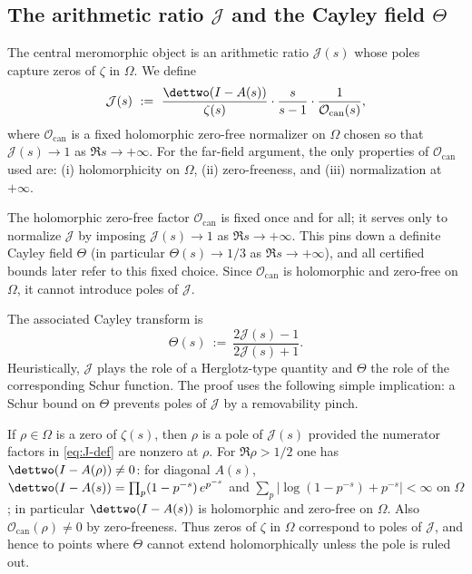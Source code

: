 \documentclass[11pt]{article}
\begin{document}
\subsection*{The arithmetic ratio \texorpdfstring{$\mathcal J$}{J} and the Cayley field \texorpdfstring{$\Theta$}{Theta}}
The central meromorphic object is an arithmetic ratio $\mathcal J(s)$ whose poles capture zeros of $\zeta$ in $\Omega$.
We define
\begin{equation}\label{eq:J-def}
  \mathcal{J}(s)\ :=\ \frac{\dettwo(I-A(s))}{\zeta(s)}\cdot \frac{s}{s-1}\cdot \frac{1}{\mathcal O_{\mathrm{can}}(s)},
\end{equation}
where $\mathcal O_{\mathrm{can}}$ is a fixed holomorphic zero-free normalizer on $\Omega$ chosen so that $\mathcal J(s)\to 1$ as $\Re s\to+\infty$.
For the far-field argument, the only properties of $\mathcal O_{\mathrm{can}}$ used are: (i) holomorphicity on $\Omega$, (ii) zero-freeness, and (iii) normalization at $+\infty$.

\begin{remark}\label{rem:Ocan-role}
The holomorphic zero-free factor $\mathcal O_{\mathrm{can}}$ is fixed once and for all; it serves only to normalize $\mathcal J$ by imposing $\mathcal J(s)\to 1$ as $\Re s\to+\infty$.
This pins down a definite Cayley field $\Theta$ (in particular $\Theta(s)\to 1/3$ as $\Re s\to+\infty$), and all certified bounds later refer to this fixed choice.
Since $\mathcal O_{\mathrm{can}}$ is holomorphic and zero-free on $\Omega$, it cannot introduce poles of $\mathcal J$.
\end{remark}

The associated Cayley transform is
\begin{equation}\label{eq:Theta-def}
  \Theta(s)\ :=\ \frac{2\mathcal J(s)-1}{2\mathcal J(s)+1}.
\end{equation}
Heuristically, $\mathcal J$ plays the role of a Herglotz-type quantity and $\Theta$ the role of the corresponding Schur function.
The proof uses the following simple implication: a Schur bound on $\Theta$ prevents poles of $\mathcal J$ by a removability pinch.

\begin{remark}\label{rem:poles}
If $\rho\in\Omega$ is a zero of $\zeta(s)$, then $\rho$ is a pole of $\mathcal J(s)$ provided the numerator factors in \eqref{eq:J-def} are nonzero at $\rho$.
For $\Re\rho>1/2$ one has $\dettwo(I-A(\rho))\neq 0$: for diagonal $A(s)$,
$\dettwo(I-A(s))=\prod_{p}(1-p^{-s})\,e^{p^{-s}}$ and $\sum_{p}|\log(1-p^{-s})+p^{-s}|<\infty$ on $\Omega$; in particular $\dettwo(I-A(s))$ is holomorphic and zero-free on $\Omega$.
Also $\mathcal O_{\mathrm{can}}(\rho)\neq 0$ by zero-freeness.
Thus zeros of $\zeta$ in $\Omega$ correspond to poles of $\mathcal J$, and hence to points where $\Theta$ cannot extend holomorphically unless the pole is ruled out.
\end{remark}
\end{document}
